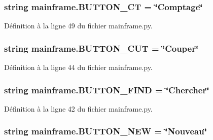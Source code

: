 \subsubsection[{B\+U\+T\+T\+O\+N\+\_\+\+C\+T}]{\setlength{\rightskip}{0pt plus 5cm}string mainframe.\+B\+U\+T\+T\+O\+N\+\_\+\+C\+T = \char`\"{}Comptage\char`\"{}}\label{namespacemainframe_a5819a70500ef6ef239e7ab58a21b8558}


Définition à la ligne 49 du fichier mainframe.\+py.

\hypertarget{namespacemainframe_aca439e8911986f6bf15170e358d7c69a}{}
\subsubsection[{B\+U\+T\+T\+O\+N\+\_\+\+C\+U\+T}]{\setlength{\rightskip}{0pt plus 5cm}string mainframe.\+B\+U\+T\+T\+O\+N\+\_\+\+C\+U\+T = \char`\"{}Couper\char`\"{}}\label{namespacemainframe_aca439e8911986f6bf15170e358d7c69a}


Définition à la ligne 44 du fichier mainframe.\+py.

\hypertarget{namespacemainframe_a0ee34ea1859c695536f5519610b4bac2}{}
\subsubsection[{B\+U\+T\+T\+O\+N\+\_\+\+F\+I\+N\+D}]{\setlength{\rightskip}{0pt plus 5cm}string mainframe.\+B\+U\+T\+T\+O\+N\+\_\+\+F\+I\+N\+D = \char`\"{}Chercher\char`\"{}}\label{namespacemainframe_a0ee34ea1859c695536f5519610b4bac2}


Définition à la ligne 42 du fichier mainframe.\+py.

\hypertarget{namespacemainframe_ae4415cd1bd468aab3cb32677fa90a17e}{}
\subsubsection[{B\+U\+T\+T\+O\+N\+\_\+\+N\+E\+W}]{\setlength{\rightskip}{0pt plus 5cm}string mainframe.\+B\+U\+T\+T\+O\+N\+\_\+\+N\+E\+W = \char`\"{}Nouveau\char`\"{}}\label{namespacemainframe_ae4415cd1bd468aab3cb32677fa90a17e}


